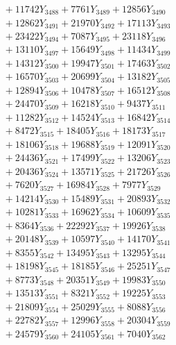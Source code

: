 \documentclass[a4paper,10pt]{article}
\begin{document}
{\begin{align}
&\;  + 11742 Y_{3488} + 7761 Y_{3489} + 12856 Y_{3490} \\[0.3ex]
&\;  + 12862 Y_{3491} + 21970 Y_{3492} + 17113 Y_{3493} \\[0.3ex]
&\;  + 23422 Y_{3494} + 7087 Y_{3495} + 23118 Y_{3496} \\[0.3ex]
&\;  + 13110 Y_{3497} + 15649 Y_{3498} + 11434 Y_{3499} \\[0.3ex]
&\;  + 14312 Y_{3500} + 19947 Y_{3501} + 17463 Y_{3502} \\[0.3ex]
&\;  + 16570 Y_{3503} + 20699 Y_{3504} + 13182 Y_{3505} \\[0.3ex]
&\;  + 12894 Y_{3506} + 10478 Y_{3507} + 16512 Y_{3508} \\[0.5ex]\allowbreak
&\;  + 24470 Y_{3509} + 16218 Y_{3510} + 9437 Y_{3511} \\[0.3ex]
&\;  + 11282 Y_{3512} + 14524 Y_{3513} + 16842 Y_{3514} \\[0.3ex]
&\;  + 8472 Y_{3515} + 18405 Y_{3516} + 18173 Y_{3517} \\[0.3ex]
&\;  + 18106 Y_{3518} + 19688 Y_{3519} + 12091 Y_{3520} \\[0.3ex]
&\;  + 24436 Y_{3521} + 17499 Y_{3522} + 13206 Y_{3523} \\[0.3ex]
&\;  + 20436 Y_{3524} + 13571 Y_{3525} + 21726 Y_{3526} \\[0.3ex]
&\;  + 7620 Y_{3527} + 16984 Y_{3528} + 7977 Y_{3529} \\[0.3ex]
&\;  + 14214 Y_{3530} + 15489 Y_{3531} + 20893 Y_{3532} \\[0.3ex]
&\;  + 10281 Y_{3533} + 16962 Y_{3534} + 10609 Y_{3535} \\[0.3ex]
&\;  + 8364 Y_{3536} + 22292 Y_{3537} + 19926 Y_{3538} \\[0.5ex]\allowbreak
&\;  + 20148 Y_{3539} + 10597 Y_{3540} + 14170 Y_{3541} \\[0.3ex]
&\;  + 8355 Y_{3542} + 13495 Y_{3543} + 13295 Y_{3544} \\[0.3ex]
&\;  + 18198 Y_{3545} + 18185 Y_{3546} + 25251 Y_{3547} \\[0.3ex]
&\;  + 8773 Y_{3548} + 20351 Y_{3549} + 19983 Y_{3550} \\[0.3ex]
&\;  + 13513 Y_{3551} + 8321 Y_{3552} + 19225 Y_{3553} \\[0.3ex]
&\;  + 21809 Y_{3554} + 25029 Y_{3555} + 8088 Y_{3556} \\[0.3ex]
&\;  + 22782 Y_{3557} + 12996 Y_{3558} + 20304 Y_{3559} \\[0.3ex]
&\;  + 24579 Y_{3560} + 24105 Y_{3561} + 7040 Y_{3562} \\[0.3ex]

\end{align}}
\end{document}
